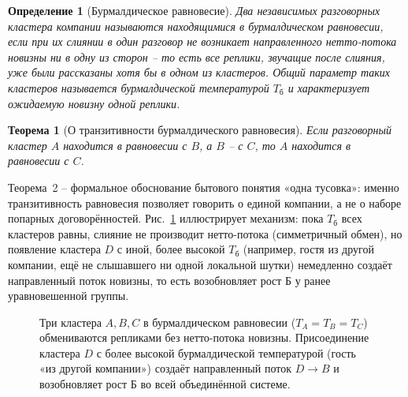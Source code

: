 \documentclass[11pt,a4paper]{article}
\newtheorem{theorem}{Теорема}
\newtheorem{definition}{Определение}
\newcommand{\Burm}{\text{Б}}
\newcommand{\Tb}{T_{\text{б}}}
\begin{document}
\begin{definition}[Бурмалдическое равновесие]
Два независимых разговорных кластера компании называются находящимися в бурмалдическом равновесии, если при их слиянии в один разговор не возникает направленного нетто-потока новизны ни в одну из сторон -- то есть все реплики, звучащие после слияния, уже были рассказаны хотя бы в одном из кластеров. Общий параметр таких кластеров называется бурмалдической температурой $\Tb$ и характеризует ожидаемую новизну одной реплики.
\end{definition}

\begin{theorem}[О транзитивности бурмалдического равновесия]
Если разговорный кластер $A$ находится в равновесии с $B$, а $B$ -- с $C$, то $A$ находится в равновесии с $C$.
\end{theorem}

Теорема~2 -- формальное обоснование бытового понятия «одна тусовка»: именно транзитивность равновесия позволяет говорить о единой компании, а не о наборе попарных договорённостей. Рис.~\ref{fig:equilibrium} иллюстрирует механизм: пока $\Tb$ всех кластеров равны, слияние не производит нетто-потока (симметричный обмен), но появление кластера $D$ с иной, более высокой $\Tb$ (например, гостя из другой компании, ещё не слышавшего ни одной локальной шутки) немедленно создаёт направленный поток новизны, то есть возобновляет рост $\Burm$ у ранее уравновешенной группы.

\begin{figure}[htbp]
\centering
{}
\caption{Три кластера $A,B,C$ в бурмалдическом равновесии ($T_A=T_B=T_C$) обмениваются репликами без нетто-потока новизны. Присоединение кластера $D$ с более высокой бурмалдической температурой (гость «из другой компании») создаёт направленный поток $D\to B$ и возобновляет рост $\Burm$ во всей объединённой системе.}
\label{fig:equilibrium}
\end{figure}
\end{document}
